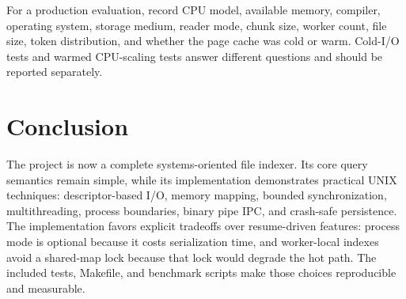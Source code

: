 \documentclass[11pt]{article}
\begin{document}
For a production evaluation, record CPU model, available memory, compiler,
operating system, storage medium, reader mode, chunk size, worker count, file
size, token distribution, and whether the page cache was cold or warm. Cold-I/O
tests and warmed CPU-scaling tests answer different questions and should be
reported separately.

\section{Conclusion}

The project is now a complete systems-oriented file indexer. Its core query
semantics remain simple, while its implementation demonstrates practical UNIX
techniques: descriptor-based I/O, memory mapping, bounded synchronization,
multithreading, process boundaries, binary pipe IPC, and crash-safe
persistence. The implementation favors explicit tradeoffs over resume-driven
features: process mode is optional because it costs serialization time, and
worker-local indexes avoid a shared-map lock because that lock would degrade
the hot path. The included tests, Makefile, and benchmark scripts make those
choices reproducible and measurable.
\end{document}
